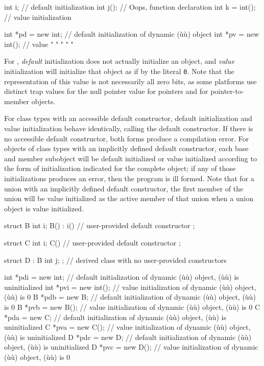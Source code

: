 \begin{emcppslisting}
int i;          // default initialization
int j();        // Oops, function declaration
int k = int();  // value initialization

int *pd = new int;    // default initialization of dynamic (ù{}ù) object
int *pv = new int();  // value        "         "     "      "    "
\end{emcppslisting}


\noindent For , \emph{default} initialization does not
actually initialize an object, and \emph{value} initialization will
initialize that object as if by the literal \lstinline!0!. Note that the
representation of this value is not necessarily all zero bits, as some
platforms use distinct trap values for the null pointer value for
pointers and for pointer-to-member objects.

For class types with an accessible  default
constructor, default initialization and value initialization behave
identically, calling the default constructor. If there is no accessible
default constructor, both forms produce a compilation error. For objects
of class types with an implicitly defined default constructor, each base
and member subobject will be default initialized or value initialized
according to the form of initialization indicated for the complete
object; if any of those initializations produces an error, then the
program is ill formed. Note that for a union with an implicitly defined
default constructor, the first member of the union will be value
initialized as the active member of that union when a union object is
value initialized.

\begin{emcppslisting}
struct B
{
    int i;
    B() : i() { }  // user-provided default constructor
};

struct C
{
    int i;
    C() { }  // user-provided default constructor
};

struct D : B { int j; };  // derived class with no user-provided constructors

int *pdi = new int;    // default initialization of dynamic (ù{}ù) object, (ù{}ù) is uninitialized
int *pvi = new int();  // value   initialization of dynamic (ù{}ù) object, (ù{}ù) is 0
B *pdb = new B;        // default initialization of dynamic (ù{}ù) object, (ù{}ù) is 0
B *pvb = new B();      // value   initialization of dynamic (ù{}ù) object, (ù{}ù) is 0
C *pda = new C;        // default initialization of dynamic (ù{}ù) object, (ù{}ù) is uninitialized
C *pva = new C();      // value   initialization of dynamic (ù{}ù) object, (ù{}ù) is uninitialized
D *pdc = new D;        // default initialization of dynamic (ù{}ù) object, (ù{}ù) is uninitialized
D *pvc = new D();      // value   initialization of dynamic (ù{}ù) object, (ù{}ù) is 0
\end{emcppslisting}


